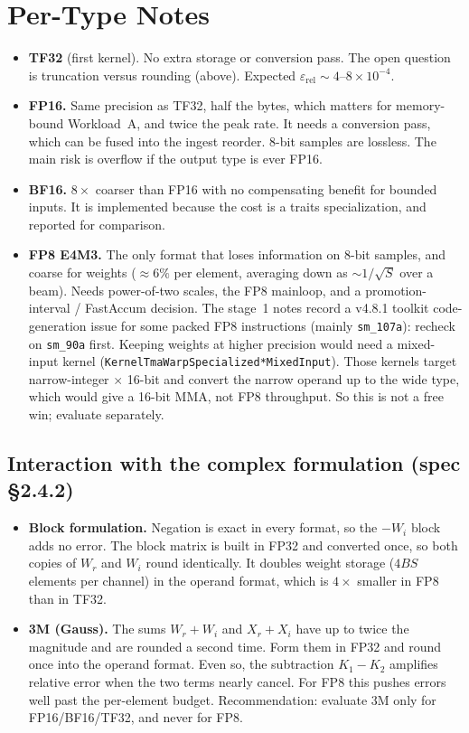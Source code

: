 \documentclass[10pt,letterpaper]{article}
\begin{document}
\section{Per-Type Notes}

\begin{itemize}
  \item \textbf{TF32} (first kernel). No extra storage or conversion pass. The open question is truncation versus rounding (above). Expected $\varepsilon_{\mathrm{rel}} \sim 4$--$8 \times 10^{-4}$.
  \item \textbf{FP16.} Same precision as TF32, half the bytes, which matters for memory-bound Workload~A, and twice the peak rate. It needs a conversion pass, which can be fused into the ingest reorder. 8-bit samples are lossless. The main risk is overflow if the output type is ever FP16.
  \item \textbf{BF16.} $8\times$ coarser than FP16 with no compensating benefit for bounded inputs. It is implemented because the cost is a traits specialization, and reported for comparison.
  \item \textbf{FP8 E4M3.} The only format that loses information on 8-bit samples, and coarse for weights ($\approx 6\%$ per element, averaging down as $\sim 1/\sqrt{S}$ over a beam). Needs power-of-two scales, the FP8 mainloop, and a promotion-interval / FastAccum decision. The stage~1 notes record a v4.8.1 toolkit code-generation issue for some packed FP8 instructions (mainly \texttt{sm\_107a}): recheck on \texttt{sm\_90a} first. Keeping weights at higher precision would need a mixed-input kernel (\texttt{KernelTmaWarpSpecialized*MixedInput}). Those kernels target narrow-integer $\times$ 16-bit and convert the narrow operand up to the wide type, which would give a 16-bit MMA, not FP8 throughput. So this is not a free win; evaluate separately.
\end{itemize}

\subsection*{Interaction with the complex formulation (spec \S2.4.2)}
\begin{itemize}
  \item \textbf{Block formulation.} Negation is exact in every format, so the $-W_i$ block adds no error. The block matrix is built in FP32 and converted once, so both copies of $W_r$ and $W_i$ round identically. It doubles weight storage ($4BS$ elements per channel) in the operand format, which is $4\times$ smaller in FP8 than in TF32.
  \item \textbf{3M (Gauss).} The sums $W_r + W_i$ and $X_r + X_i$ have up to twice the magnitude and are rounded a second time. Form them in FP32 and round once into the operand format. Even so, the subtraction $K_1 - K_2$ amplifies relative error when the two terms nearly cancel. For FP8 this pushes errors well past the per-element budget. Recommendation: evaluate 3M only for FP16/BF16/TF32, and never for FP8.
\end{itemize}
\end{document}

